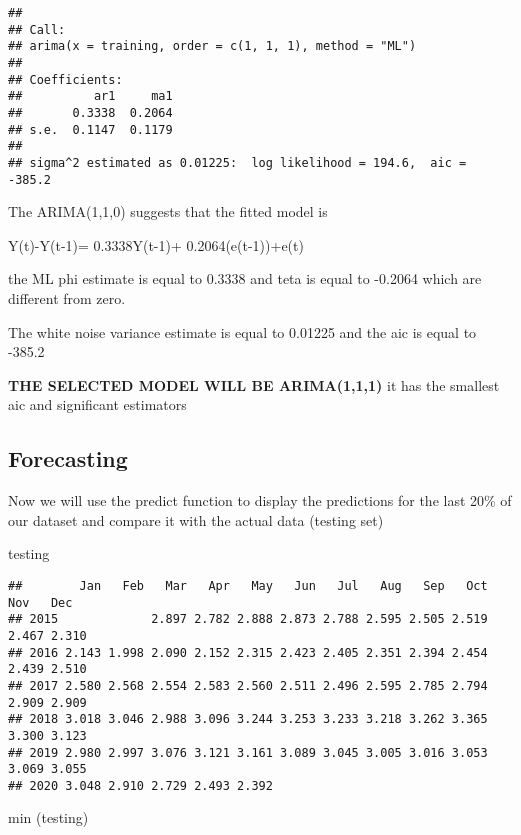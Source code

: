 \documentclass[
]{article}
\newenvironment{Shaded}{\begin{snugshade}}{\end{snugshade}}
\newcommand{\FunctionTok}[1]{\textcolor[rgb]{0.00,0.00,0.00}{#1}}
\newcommand{\NormalTok}[1]{#1}
\begin{document}
\begin{verbatim}
## 
## Call:
## arima(x = training, order = c(1, 1, 1), method = "ML")
## 
## Coefficients:
##          ar1     ma1
##       0.3338  0.2064
## s.e.  0.1147  0.1179
## 
## sigma^2 estimated as 0.01225:  log likelihood = 194.6,  aic = -385.2
\end{verbatim}

The ARIMA(1,1,0) suggests that the fitted model is

Y(t)-Y(t-1)= 0.3338Y(t-1)+ 0.2064(e(t-1))+e(t)

the ML phi estimate is equal to 0.3338 and teta is equal to -0.2064
which are different from zero.

The white noise variance estimate is equal to 0.01225 and the aic is
equal to -385.2

\textbf{THE SELECTED MODEL WILL BE ARIMA(1,1,1)} it has the smallest aic
and significant estimators

\hypertarget{forecasting}{%
\subsection{Forecasting}\label{forecasting}}

Now we will use the predict function to display the predictions for the
last 20\% of our dataset and compare it with the actual data (testing
set)

\begin{Shaded}
\begin{Highlighting}[]
\NormalTok{testing}
\end{Highlighting}
\end{Shaded}

\begin{verbatim}
##        Jan   Feb   Mar   Apr   May   Jun   Jul   Aug   Sep   Oct   Nov   Dec
## 2015             2.897 2.782 2.888 2.873 2.788 2.595 2.505 2.519 2.467 2.310
## 2016 2.143 1.998 2.090 2.152 2.315 2.423 2.405 2.351 2.394 2.454 2.439 2.510
## 2017 2.580 2.568 2.554 2.583 2.560 2.511 2.496 2.595 2.785 2.794 2.909 2.909
## 2018 3.018 3.046 2.988 3.096 3.244 3.253 3.233 3.218 3.262 3.365 3.300 3.123
## 2019 2.980 2.997 3.076 3.121 3.161 3.089 3.045 3.005 3.016 3.053 3.069 3.055
## 2020 3.048 2.910 2.729 2.493 2.392
\end{verbatim}

\begin{Shaded}
\begin{Highlighting}[]
\FunctionTok{min}\NormalTok{ (testing)}
\end{Highlighting}
\end{Shaded}
\end{document}
